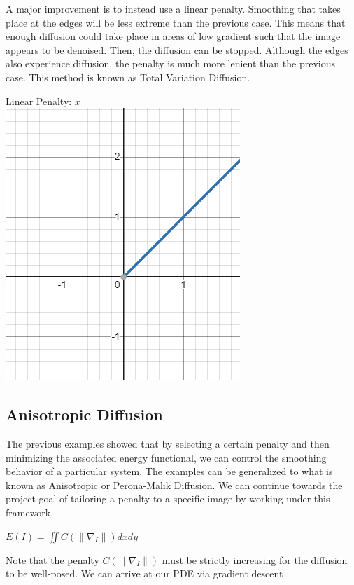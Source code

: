 \documentclass{article}
\begin{document}
  \noindent
  A major improvement is to instead use a linear penalty. Smoothing that takes place at the edges
  will be less extreme than the previous case. This means that enough diffusion could take place
  in areas of low gradient such that the image appears to be denoised. Then, the diffusion can be stopped.
  Although the edges also experience diffusion, the penalty is much more lenient than the previous case.
  This method is known as Total Variation Diffusion.
  \begin{center}
    Linear Penalty: $x$\\
    \vspace{12pt}
    \includegraphics[scale=0.5]{../report_images/linear.png}
  \end{center}

  \newpage
  \noindent
  \subsection{Anisotropic Diffusion}
  The previous examples showed that by selecting a certain penalty and then minimizing the
  associated energy functional, we can control the smoothing behavior of a particular system.
  The examples can be generalized to what is known as Anisotropic or Perona-Malik Diffusion.
  We can continue towards the project goal of tailoring a penalty to a specific image
  by working under this framework.
  \begin{center}
    $E(I) = \iint C(\| \nabla_{I} \|) dx dy$
  \end{center}
  Note that the penalty $C(\| \nabla_{I} \|)$
  must be strictly increasing for the diffusion to be well-posed. We can
  arrive at our PDE via gradient descent\\
\end{document}
